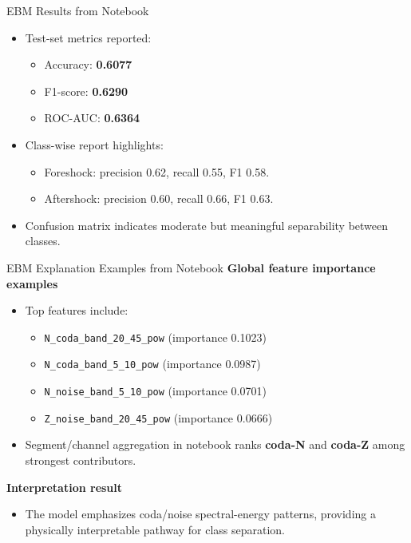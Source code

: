 \documentclass[aspectratio=169]{beamer}
\begin{document}
\begin{frame}{EBM Results from Notebook}
\begin{itemize}
  \item Test-set metrics reported:
  \begin{itemize}
    \item Accuracy: \textbf{0.6077}
    \item F1-score: \textbf{0.6290}
    \item ROC-AUC: \textbf{0.6364}
  \end{itemize}
  \item Class-wise report highlights:
  \begin{itemize}
    \item Foreshock: precision 0.62, recall 0.55, F1 0.58.
    \item Aftershock: precision 0.60, recall 0.66, F1 0.63.
  \end{itemize}
  \item Confusion matrix indicates moderate but meaningful separability between classes.
\end{itemize}
\end{frame}

\begin{frame}{EBM Explanation Examples from Notebook}
\textbf{Global feature importance examples}
\begin{itemize}
  \item Top features include:
  \begin{itemize}
    \item \texttt{N\_coda\_band\_20\_45\_pow} (importance 0.1023)
    \item \texttt{N\_coda\_band\_5\_10\_pow} (importance 0.0987)
    \item \texttt{N\_noise\_band\_5\_10\_pow} (importance 0.0701)
    \item \texttt{Z\_noise\_band\_20\_45\_pow} (importance 0.0666)
  \end{itemize}
  \item Segment/channel aggregation in notebook ranks \textbf{coda-N} and \textbf{coda-Z} among strongest contributors.
\end{itemize}

\textbf{Interpretation result}
\begin{itemize}
  \item The model emphasizes coda/noise spectral-energy patterns, providing a physically interpretable pathway for class separation.
\end{itemize}
\end{frame}
\end{document}
